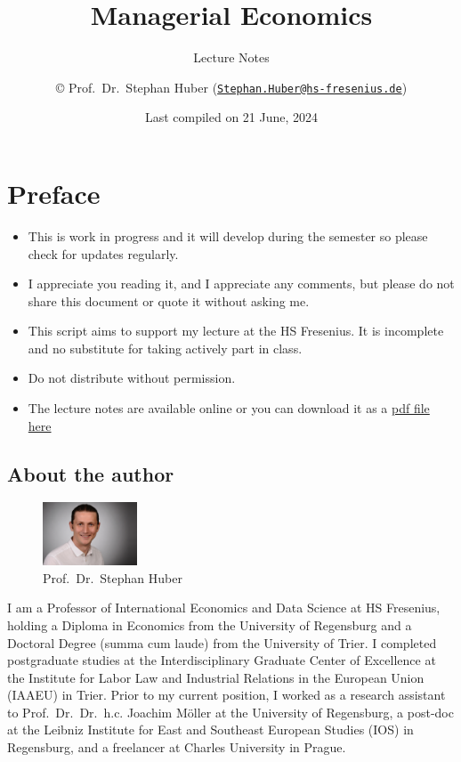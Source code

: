 \documentclass[
  12pt,
  oneside]{book}
\title{Managerial Economics}
\subtitle{Lecture Notes}
\author{© Prof.~Dr.~Stephan Huber (\href{mailto:Stephan.Huber@hs-fresenius.de}{\nolinkurl{Stephan.Huber@hs-fresenius.de}})}
\date{Last compiled on 21 June, 2024}
\providecommand{\tightlist}{%
  \setlength{\itemsep}{0pt}\setlength{\parskip}{0pt}}
\theoremstyle{definition}
\theoremstyle{definition}
\theoremstyle{definition}
\theoremstyle{definition}
\theoremstyle{remark}
\begin{document}
\maketitle

{
\hypersetup{linkcolor=}
\setcounter{tocdepth}{2}
\tableofcontents
}
\hypertarget{preface}{%
\chapter*{Preface}\label{preface}}

\begin{itemize}
\tightlist
\item
  This is work in progress and it will develop during the semester so please check for updates regularly.
\item
  I appreciate you reading it, and I appreciate any comments, but please do not share this document or quote it without asking me.
\item
  This script aims to support my lecture at the HS Fresenius. It is incomplete and no substitute
  for taking actively part in class.
\item
  Do not distribute without permission.
\item
  The lecture notes are available online or you can download it as a \href{https://raw.githubusercontent.com/hubchev/hubchev.github.io/main/me/_main.pdf}{pdf file here}
\end{itemize}

\hypertarget{about-the-author}{%
\section*{About the author}\label{about-the-author}}

\begin{figure}
\centering
\includegraphics[width=0.25\textwidth,height=\textheight]{fig/huber2.jpeg}
\caption[\label{fig:itsme} Prof.~Dr.~Stephan Huber]{\label{fig:itsme} Prof.~Dr.~Stephan Huber\footnotemark{}}
\end{figure}

I am a Professor of International Economics and Data Science at HS Fresenius, holding a Diploma in Economics from the University of Regensburg and a Doctoral Degree (summa cum laude) from the University of Trier. I completed postgraduate studies at the Interdisciplinary Graduate Center of Excellence at the Institute for Labor Law and Industrial Relations in the European Union (IAAEU) in Trier. Prior to my current position, I worked as a research assistant to Prof.~Dr.~Dr.~h.c. Joachim Möller at the University of Regensburg, a post-doc at the Leibniz Institute for East and Southeast European Studies (IOS) in Regensburg, and a freelancer at Charles University in Prague.
\end{document}
